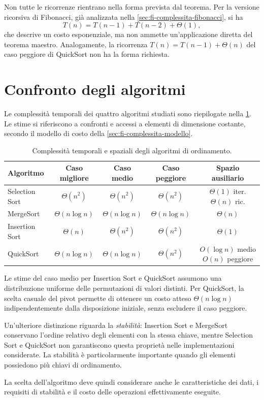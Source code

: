 Non tutte le ricorrenze rientrano nella forma prevista dal teorema.
Per la versione ricorsiva di Fibonacci, già analizzata
nella \cref{sec:fi-complessita-fibonacci}, si ha
\[
  T(n)=T(n-1)+T(n-2)+\Theta(1),
\]
che descrive un costo esponenziale, ma non ammette un'applicazione
diretta del teorema maestro. Analogamente, la ricorrenza
\(T(n)=T(n-1)+\Theta(n)\) del caso peggiore di QuickSort non ha
la forma richiesta.

\clearpage

\section{Confronto degli algoritmi}
\label{sec:fi-ordinamento-confronto}

Le complessità temporali dei quattro algoritmi studiati sono
riepilogate nella \cref{tab:fi-confronto-ordinamenti}. Le stime
si riferiscono a confronti e accessi a elementi di dimensione
costante, secondo il modello di costo della
\cref{sec:fi-complessita-modello}.

\begin{table}[htbp]
  \centering
  \small
  \setlength{\tabcolsep}{4pt}
  \begin{tabular}{lcccc}
    \hline
    Algoritmo & Caso migliore & Caso medio & Caso peggiore &
    \shortstack{Spazio\\ausiliario}\\
    \hline
    Selection Sort &
    \(\Theta(n^2)\) & \(\Theta(n^2)\) & \(\Theta(n^2)\) &
    \shortstack{\(\Theta(1)\) iter.\\\(\Theta(n)\) ric.}\\
    MergeSort &
    \(\Theta(n\log n)\) & \(\Theta(n\log n)\) & \(\Theta(n\log n)\) &
    \(\Theta(n)\)\\
    Insertion Sort &
    \(\Theta(n)\) & \(\Theta(n^2)\) & \(\Theta(n^2)\) &
    \(\Theta(1)\)\\
    QuickSort &
    \(\Theta(n\log n)\) & \(\Theta(n\log n)\) & \(\Theta(n^2)\) &
    \shortstack{\(O(\log n)\) medio\\\(O(n)\) peggiore}\\
    \hline
  \end{tabular}
  \caption{Complessità temporali e spaziali degli algoritmi di ordinamento.}
  \label{tab:fi-confronto-ordinamenti}
\end{table}

Le stime del caso medio per Insertion Sort e QuickSort assumono
una distribuzione uniforme delle permutazioni di valori distinti.
Per QuickSort, la scelta casuale del pivot permette di ottenere
un costo atteso \(\Theta(n\log n)\) indipendentemente dalla
disposizione iniziale, senza escludere il caso peggiore.

Un'ulteriore distinzione riguarda la \emph{stabilità}:
Insertion Sort e MergeSort conservano l'ordine relativo degli
elementi con la stessa chiave, mentre Selection Sort e QuickSort
non garantiscono questa proprietà nelle implementazioni considerate.
La stabilità è particolarmente importante quando gli elementi
possiedono più chiavi di ordinamento.

La scelta dell'algoritmo deve quindi considerare anche le
caratteristiche dei dati, i requisiti di stabilità e il costo
delle operazioni effettivamente eseguite.
